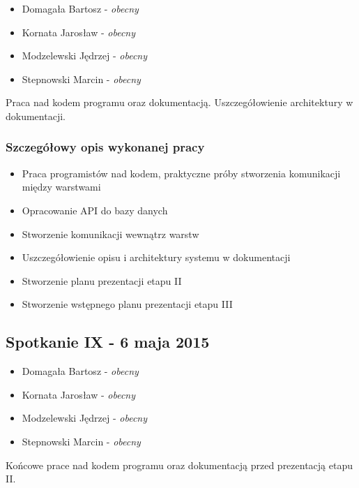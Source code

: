 \begin{itemize}
\item Domagała Bartosz - \textit{obecny}
\item Kornata Jarosław - \textit{obecny}
\item Modzelewski Jędrzej - \textit{obecny}
\item Stepnowski Marcin - \textit{obecny}
\end{itemize}

\par{Praca nad kodem programu oraz dokumentacją. Uszczegółowienie architektury w dokumentacji.}

\subsubsection*[Szczegółowy opis wykonanej pracy]{Szczegółowy opis wykonanej pracy}
\begin{itemize}
\item Praca programistów nad kodem, praktyczne próby stworzenia komunikacji między warstwami
\item Opracowanie API do bazy danych
\item Stworzenie komunikacji wewnątrz warstw
\item Uszczegółowienie opisu i architektury systemu w dokumentacji
\item Stworzenie planu prezentacji etapu II
\item Stworzenie wstępnego planu prezentacji etapu III
\end{itemize}

\subsection[Spotkanie IX - 6 maja 2015]{Spotkanie IX - 6 maja 2015}

\begin{itemize}
\item Domagała Bartosz - \textit{obecny}
\item Kornata Jarosław - \textit{obecny}
\item Modzelewski Jędrzej - \textit{obecny}
\item Stepnowski Marcin - \textit{obecny}
\end{itemize}

\par{Końcowe prace nad kodem programu oraz dokumentacją przed prezentacją etapu II.}

